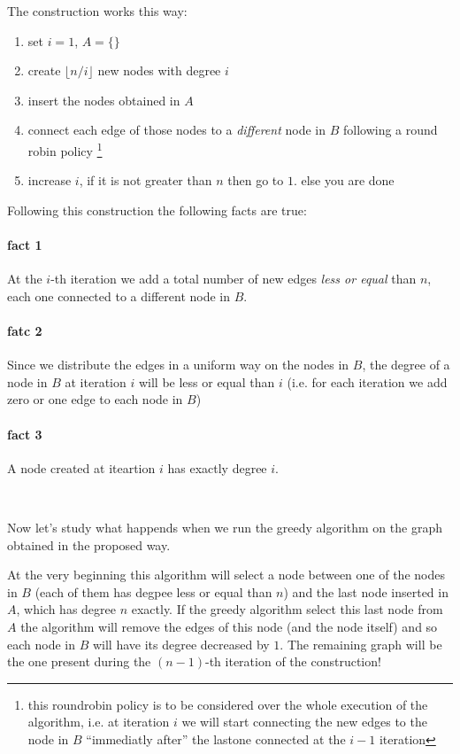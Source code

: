 \documentclass[a4paper]{article}
\begin{document}
The construction works this way:
\begin{enumerate}
\item set $i = 1$, $A = \{\}$
\item create $\lfloor n/i \rfloor$ new nodes with degree $i$ 
\item insert the nodes obtained in $A$
\item connect each edge of those nodes to a \emph{different} node in $B$ following a round robin policy \footnote{this roundrobin policy is to be considered over the whole execution of the algorithm, i.e. at iteration $i$ we will start connecting the new edges to the node in $B$ ``immediatly after'' the lastone connected at the $i-1$ iteration}
\item increase $i$, if it is not greater than $n$ then go to $1.$ else you are done
\end{enumerate}

Following this construction the following facts are true:

\paragraph{fact 1}At the $i$-th iteration we add a total number of new edges \emph{less or equal} than $n$, each one connected to a different node in $B$.

\paragraph{fatc 2}Since we distribute the edges in a uniform way on the nodes in $B$, the degree of a node in $B$ at iteration $i$ will be less or equal than $i$ (i.e. for each iteration we add zero or one edge to each node in $B$)
\paragraph{fact 3}A node created at iteartion $i$ has exactly degree $i$.

\

\noindent Now let's study what happends when we run the greedy algorithm on the graph obtained in the proposed way.

At the very beginning this algorithm will select a node between one of the nodes in $B$ (each of them has degpee less or equal than $n$) and the last node inserted in $A$, which has degree $n$ exactly.
If the greedy algorithm select this last node from $A$ the algorithm will remove the edges of this node (and the node itself) and so each node in $B$ will have its degree decreased by $1$.
The remaining graph will be the one present during the $(n-1)$-th iteration of the construction!
\end{document}
